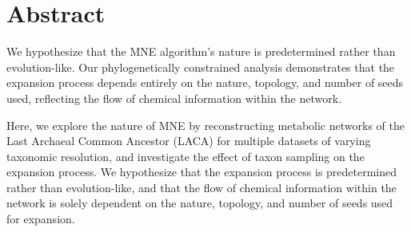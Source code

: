 \newpage
\thispagestyle{empty}
\section*{\textbf{Abstract}}

\large 

We hypothesize that the MNE algorithm's nature is predetermined rather than evolution-like. Our phylogenetically constrained analysis demonstrates that the expansion process depends entirely on the nature, topology, and number of seeds used, reflecting the flow of chemical information within the network.

Here, we explore the nature of MNE by reconstructing metabolic networks of the Last Archaeal Common Ancestor (LACA) for multiple datasets of varying taxonomic resolution, and investigate the effect of taxon sampling on the expansion process. We hypothesize that the expansion process is predetermined rather than evolution-like, and that the flow of chemical information within the network is solely dependent on the nature, topology, and number of seeds used for expansion.